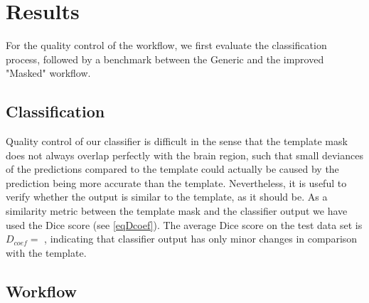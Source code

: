 \section{Results}
For the quality control of the workflow, we first evaluate the classification process, followed by a benchmark between the Generic and the improved "Masked" workflow.

\subsection{Classification}
Quality control of our classifier is difficult in the sense that the template mask does not always overlap perfectly with the brain region, such that small deviances of the predictions compared to the template could actually be caused by the prediction being more accurate than the template.
Nevertheless, it is useful to verify whether the output is similar to the template, as it should be.
As a similarity metric between the template mask and the classifier output we have used the Dice score (see \cref{eqDcoef}).
The average Dice score on the test data set is $D_{coef}= $
, indicating that classifier output has only minor changes in comparison with the template.


\begin{sansmath}
\end{sansmath}

\subsection{Workflow}
\begin{sansmath}
\end{sansmath}

